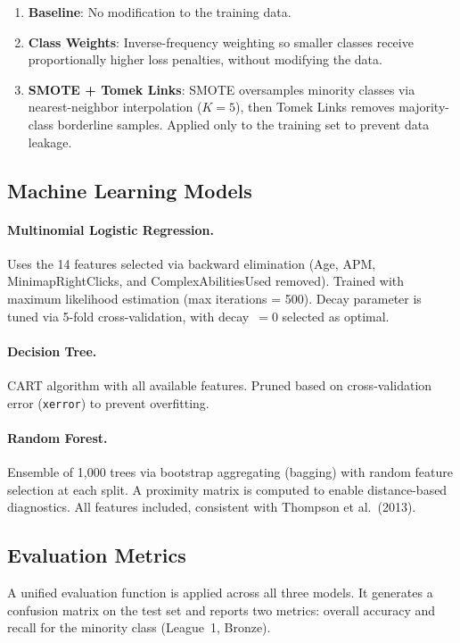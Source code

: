 \documentclass[12pt, a4paper]{article}
\begin{document}
\begin{enumerate}[itemsep=2pt]
    \item \textbf{Baseline}: No modification to the training data.
    \item \textbf{Class Weights}: Inverse-frequency weighting so smaller classes receive
          proportionally higher loss penalties, without modifying the data.
    \item \textbf{SMOTE + Tomek Links}: SMOTE oversamples minority classes via
          nearest-neighbor interpolation ($K=5$), then Tomek Links removes majority-class
          borderline samples. Applied only to the training set to prevent data leakage.
\end{enumerate}

\subsection{Machine Learning Models}

\paragraph{Multinomial Logistic Regression.}
Uses the 14 features selected via backward elimination (Age, APM, MinimapRightClicks,
and ComplexAbilitiesUsed removed). Trained with maximum likelihood estimation
(max iterations = 500). Decay parameter is tuned via 5-fold cross-validation,
with decay~$= 0$ selected as optimal.

\paragraph{Decision Tree.}
CART algorithm with all available features. Pruned based on cross-validation error
(\texttt{xerror}) to prevent overfitting.

\paragraph{Random Forest.}
Ensemble of 1,000 trees via bootstrap aggregating (bagging) with random feature
selection at each split. A proximity matrix is computed to enable distance-based
diagnostics. All features included, consistent with Thompson et al.\ (2013).

\subsection{Evaluation Metrics}

A unified evaluation function is applied across all three models. It generates a
confusion matrix on the test set and reports two metrics: overall accuracy and
recall for the minority class (League~1, Bronze).
\end{document}

